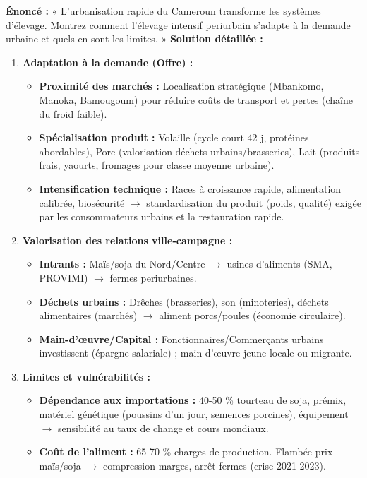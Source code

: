 \documentclass[11pt]{article}
\begin{document}
\begin{exoresolu}
\textbf{Énoncé :} « L'urbanisation rapide du Cameroun transforme les systèmes d'élevage. Montrez comment l'élevage intensif periurbain s'adapte à la demande urbaine et quels en sont les limites. » \tcblower
\textbf{Solution détaillée :}
\begin{enumerate}
    \item \textbf{Adaptation à la demande (Offre) :}
    \begin{itemize}
        \item \textbf{Proximité des marchés :} Localisation stratégique (Mbankomo, Manoka, Bamougoum) pour réduire coûts de transport et pertes (chaîne du froid faible).
        \item \textbf{Spécialisation produit :} Volaille (cycle court 42 j, protéines abordables), Porc (valorisation déchets urbains/brasseries), Lait (produits frais, yaourts, fromages pour classe moyenne urbaine).
        \item \textbf{Intensification technique :} Races à croissance rapide, alimentation calibrée, biosécurité $\to$ standardisation du produit (poids, qualité) exigée par les consommateurs urbains et la restauration rapide.
    \end{itemize}
    \item \textbf{Valorisation des relations ville-campagne :}
    \begin{itemize}
        \item \textbf{Intrants :} Maïs/soja du Nord/Centre $\to$ usines d'aliments (SMA, PROVIMI) $\to$ fermes periurbaines.
        \item \textbf{Déchets urbains :} Drêches (brasseries), son (minoteries), déchets alimentaires (marchés) $\to$ aliment porcs/poules (économie circulaire).
        \item \textbf{Main-d'œuvre/Capital :} Fonctionnaires/Commerçants urbains investissent (épargne salariale) ; main-d'œuvre jeune locale ou migrante.
    \end{itemize}
    \item \textbf{Limites et vulnérabilités :}
    \begin{itemize}
        \item \textbf{Dépendance aux importations :} 40-50 \% tourteau de soja, prémix, matériel génétique (poussins d'un jour, semences porcines), équipement $\to$ sensibilité au taux de change et cours mondiaux.
        \item \textbf{Coût de l'aliment :} 65-70 \% charges de production. Flambée prix maïs/soja $\to$ compression marges, arrêt fermes (crise 2021-2023).

\end{itemize}
\end{enumerate}
\end{exoresolu}
\end{document}
